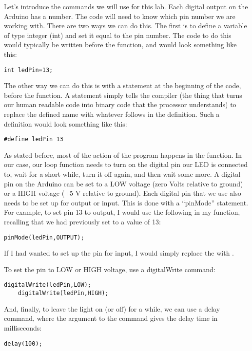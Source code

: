 Let's introduce the commands we will use for this lab. Each digital output on
the Arduino has a number. The code will need to know which pin number we are
working with. There are two ways we can do this. The first is to define a 
variable of type integer (int) and set it equal to the pin number. The code to
do this would typically be written before the  function, and 
would look something like this:
\begin{lstlisting}[language=Arduino] 
int ledPin=13;
\end{lstlisting}
The other way we can do this is with a  
statement at the beginning of the code,
before the  function.
A  statement 
simply tells the compiler (the thing that turns our human
readable code into binary code that the processor understands) to replace the
defined name with whatever follows in the definition. Such a definition would
look something like this:
\begin{lstlisting}[language=Arduino] 
#define ledPin 13
\end{lstlisting}

As stated before, most of the action of the program happens in the
 function. In our case, our loop function needs to turn on
the digital pin our LED is connected to, wait for a short while, turn it off
again, and then wait some more.
A digital pin on the Arduino can be set to a LOW voltage (zero Volts relative
to ground) or a HIGH voltage (+5 V relative to ground). Each digital pin that
we use also needs to be set up for output or input. This is done with a 
``pinMode'' statement. For example, to set pin 13 to output, I would use the 
following in my  function, recalling that we had previously
set  to a value of 13:
\begin{lstlisting}[language=Arduino] 
    pinMode(ledPin,OUTPUT);
\end{lstlisting}
If I had wanted to set up the pin for input, I would simply replace the
 with .

To set the pin to LOW or HIGH voltage, use a digitalWrite command:
\begin{lstlisting}[language=Arduino] 
    digitalWrite(ledPin,LOW);
    digitalWrite(ledPin,HIGH);
\end{lstlisting}
And, finally, to leave the light on (or off) for a while, we can use
a delay command, where the argument to the command gives the delay time in
milliseconds:
\begin{lstlisting}[language=Arduino] 
    delay(100);
\end{lstlisting}

